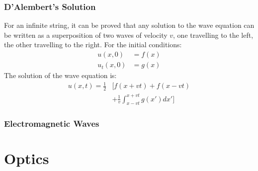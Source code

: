 \documentclass[11pt]{article}
\begin{document}
\begin{multicols*}{3}
\subsubsection{D'Alembert's Solution}
For an infinite string, it can be proved that any solution to the wave equation can be written as a superposition of two waves of velocity $v$, one travelling to the left, the other travelling to the right. For the initial conditions:
\begin{align*}
  u(x, 0) &= f(x) \\
  u_t(x, 0) &= g(x)
\end{align*}
The solution of the wave equation is:
\begin{align*}
  u(x, t) = \frac{1}{2} &\bigg[ f(x+vt) + f(x-vt)  \\
    &+ \frac{1}{v}\int_{x-vt}^{x+vt}g(x') dx' \bigg]
\end{align*}
\subsubsection{Electromagnetic Waves}

\section{Optics}

\end{multicols*}
\end{document}
